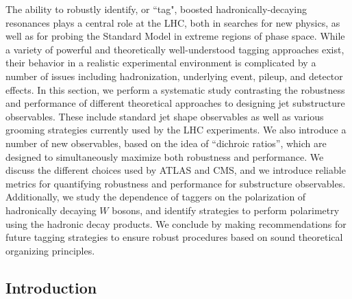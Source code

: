 The ability to robustly identify, or ``tag", boosted hadronically-decaying resonances plays a central role at the LHC, both in
  searches for new physics, as well as for probing the Standard Model
  in extreme regions of phase space.
  While a variety of powerful and
  theoretically well-understood tagging approaches exist, their behavior in a realistic experimental environment is complicated by a number of issues including hadronization, underlying event, pileup, and detector effects.
  In this section, we perform a
  systematic study contrasting the robustness and performance of
  different theoretical approaches to designing jet substructure
  observables.
  These include standard jet shape observables as well as various grooming
  strategies currently used by the LHC experiments.
  We also introduce a number of new observables, based on the idea of
  ``dichroic ratios'', which are designed to simultaneously maximize both
  robustness and performance.
%
  We discuss
  the different choices used by ATLAS and CMS, and we introduce
  reliable metrics for quantifying robustness and performance for
  substructure observables.
  Additionally, we study the dependence of taggers on the polarization of hadronically decaying $W$ bosons, and identify strategies to perform polarimetry using the hadronic decay products.
%  
We conclude by making recommendations for future
  tagging strategies to ensure robust procedures based on sound
  theoretical organizing principles.

\subsection{Introduction}\label{sec:SM_jetsub_2prong:intro}

